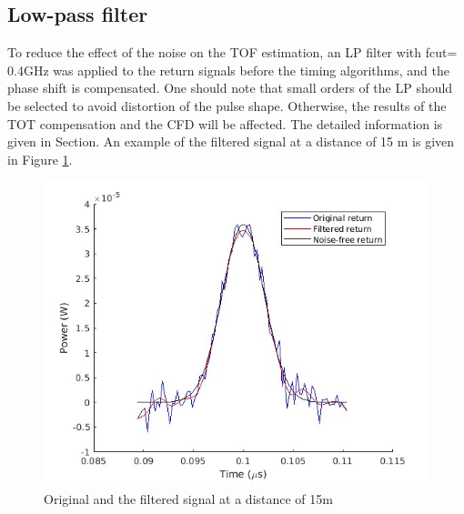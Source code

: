 \subsection{Low-pass filter}
To reduce the effect of the noise on the TOF estimation, an LP filter with fcut= 0.4GHz was applied to the return signals before the timing algorithms, and the phase shift is compensated. One should note that small orders of the LP should be selected to avoid distortion of the pulse shape. Otherwise, the results of the TOT compensation and the CFD will be affected. The detailed information is given in Section. An example of the filtered signal at a distance of 15 m is given in Figure \ref{fig:TDC_sig_filt}.
\begin{figure}[t!p]
\centering
\includegraphics[width=.8\textwidth]{figures/chapter7_TDC/signal_filtered_d15.jpg}
\caption{Original and the filtered signal at a distance of 15m}
\label{fig:TDC_sig_filt}
\end{figure}
